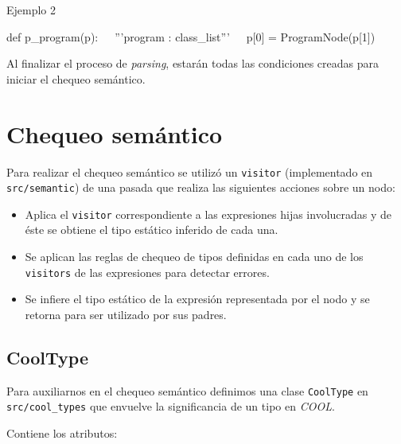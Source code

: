 \documentclass[a4paper,10pt,twocolumn]{article}
\begin{document}
\begin{algorithm}
	\caption{Ejemplo 2}
	\begin{algorithmic}
		\STATE def p\_program(p):
		\STATE $\;\;\; $ '''program : class\_list'''
		\STATE $\;\;\; $ p[0] = ProgramNode(p[1])
	\end{algorithmic}
\end{algorithm}

Al finalizar el proceso de \textit{parsing}, estarán todas las condiciones creadas para iniciar el chequeo semántico.

\section{Chequeo semántico}

Para realizar el chequeo semántico se utilizó un \lstinline|visitor| (implementado en \lstinline|src/semantic|) de una pasada que realiza las siguientes acciones sobre un nodo:

\begin{itemize}
	\item Aplica el \lstinline|visitor| correspondiente a las expresiones hijas involucradas y de éste se obtiene el tipo estático inferido de cada una. 
	\item Se aplican las reglas de chequeo de tipos definidas en cada uno de los \lstinline|visitors| de las expresiones para detectar errores. 
	\item Se infiere el tipo estático de la expresión representada por el nodo y se retorna para ser utilizado por sus padres. 
\end{itemize}

\subsection{CoolType}
Para auxiliarnos en el chequeo semántico definimos una clase \lstinline|CoolType| en \lstinline|src/cool_types| que envuelve la significancia de un tipo en \textit{COOL}. 

Contiene los atributos:
\end{document}
